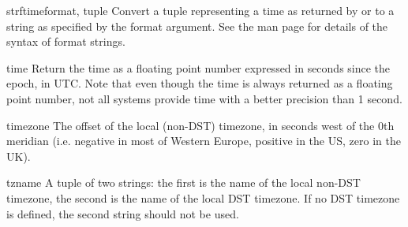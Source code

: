 \begin{funcdesc}{strftime}{format, tuple}
Convert a tuple representing a time as returned by  or
 to a string as specified by the format argument.
See the  man page for details of the syntax of
format strings.
\end{funcdesc}

\begin{funcdesc}{time}{}
Return the time as a floating point number expressed in seconds since
the epoch, in UTC.  Note that even though the time is always returned
as a floating point number, not all systems provide time with a better
precision than 1 second.
\end{funcdesc}

\begin{datadesc}{timezone}
The offset of the local (non-DST) timezone, in seconds west of the 0th
meridian (i.e. negative in most of Western Europe, positive in the US,
zero in the UK).
\end{datadesc}

\begin{datadesc}{tzname}
A tuple of two strings: the first is the name of the local non-DST
timezone, the second is the name of the local DST timezone.  If no DST
timezone is defined, the second string should not be used.
\end{datadesc}
